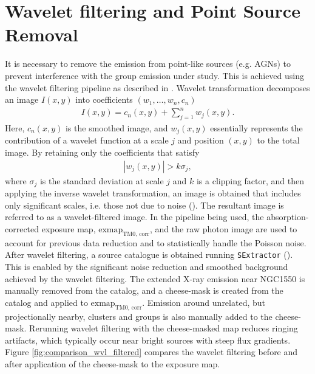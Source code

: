 \section{Wavelet filtering and Point Source Removal}
It is necessary to remove the emission from point-like sources (e.g. AGNs) to prevent interference with the group emission under study. This is achieved using the wavelet filtering pipeline as described in \cite{Pacaud2006}. Wavelet transformation decomposes an image \(I(x, y)\) into coefficients \((w_1, \ldots, w_n, c_n)\)
\begin{align*}
I(x, y) = c_n(x, y) + \sum_{j=1}^{n}w_j(x, y).    
\end{align*}
Here, \(c_n(x, y)\) is the smoothed image, and \(w_j(x, y)\) essentially represents the contribution of a wavelet function at a scale \(j\) and position \((x, y)\) to the total image. By retaining only the coefficients that satisfy
\begin{align*}
|w_j(x, y)| > k\sigma_j,
\end{align*}
where \(\sigma_j\) is the standard deviation at scale \(j\) and \(k\) is a clipping factor, and then applying the inverse wavelet transformation, an image is obtained that includes only significant scales, i.e. those not due to noise (\cite{Stark1998}). The resultant image is referred to as a wavelet-filtered image. In the pipeline being used, the absorption-corrected exposure map, \(\text{exmap}_\text{TM0, corr}\), and the raw photon image are used to account for previous data reduction and to statistically handle the Poisson noise. After wavelet filtering, a source catalogue is obtained running \texttt{SExtractor} (\cite{Bertin1996}). This is enabled by the significant noise reduction and smoothed background achieved by the wavelet filtering. The extended X-ray emission near NGC1550 is manually removed from the catalog, and a cheese-mask is created from the catalog and applied to \(\text{exmap}_\text{TM0, corr}\). Emission around unrelated, but projectionally nearby, clusters and groups is also manually added to the cheese-mask. Rerunning wavelet filtering with the cheese-masked map reduces ringing artifacts, which typically occur near bright sources with steep flux gradients. Figure \ref{fig:comparison_wvl_filtered} compares the wavelet filtering before and after application of the cheese-mask to the exposure map.
%
